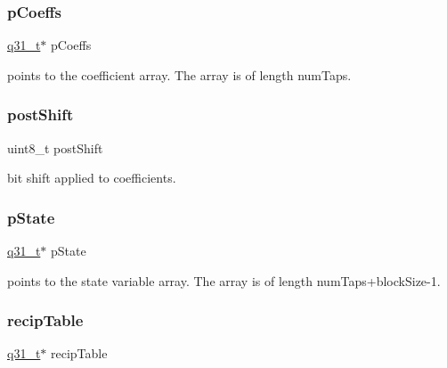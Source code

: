 \subsubsection{\texorpdfstring{pCoeffs}{pCoeffs}}
{\footnotesize\ttfamily \mbox{\hyperlink{arm__math_8h_adc89a3547f5324b7b3b95adec3806bc0}{q31\+\_\+t}}$\ast$ p\+Coeffs}

points to the coefficient array. The array is of length num\+Taps. \mbox{\label{structarm__lms__norm__instance__q31_a74050e9f36542bd56f4052381a82ae8f}} 
\subsubsection{\texorpdfstring{postShift}{postShift}}
{\footnotesize\ttfamily uint8\+\_\+t post\+Shift}

bit shift applied to coefficients. \mbox{\label{structarm__lms__norm__instance__q31_adee4ba3ee8869865af7d8fa08ca913d6}} 
\subsubsection{\texorpdfstring{pState}{pState}}
{\footnotesize\ttfamily \mbox{\hyperlink{arm__math_8h_adc89a3547f5324b7b3b95adec3806bc0}{q31\+\_\+t}}$\ast$ p\+State}

points to the state variable array. The array is of length num\+Taps+block\+Size-\/1. \mbox{\label{structarm__lms__norm__instance__q31_aec8a88dd688519b6b1e3c8d2e24bb775}} 
\subsubsection{\texorpdfstring{recipTable}{recipTable}}
{\footnotesize\ttfamily \mbox{\hyperlink{arm__math_8h_adc89a3547f5324b7b3b95adec3806bc0}{q31\+\_\+t}}$\ast$ recip\+Table}

